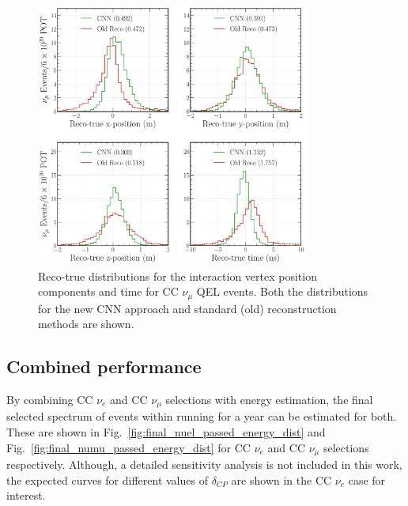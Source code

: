 \begin{figure} %
    \includegraphics[width=0.8\textwidth]{diagrams/6-cvn/chipsnet/final_vertex_numu_res_comparison.pdf}
    \caption[Reco-true distributions for the interaction vertex parameters for CC $\nu_{\mu}$ QEL
        events.] {Reco-true distributions for the interaction vertex position components and time
        for CC $\nu_{\mu}$ QEL events. Both the distributions for the new CNN approach and
        standard (old) reconstruction methods are shown.}
    \label{fig:final_vertex_numu_res_comparison}
\end{figure}

\subsection{Combined performance} %
\label{sec:cvn_results_combined} %

By combining CC $\nu_{e}$ and CC $\nu_{\mu}$ selections with energy estimation, the final selected
spectrum of events within \chipsfive running for a year can be estimated for both. These are shown
in Fig.~\ref{fig:final_nuel_passed_energy_dist} and Fig.~\ref{fig:final_numu_passed_energy_dist}
for CC $\nu_{e}$ and CC $\nu_{\mu}$ selections respectively. Although, a detailed \chipsfive
sensitivity analysis is not included in this work, the expected curves for different values of
$\delta_{CP}$ are shown in the CC $\nu_{e}$ case for interest.

